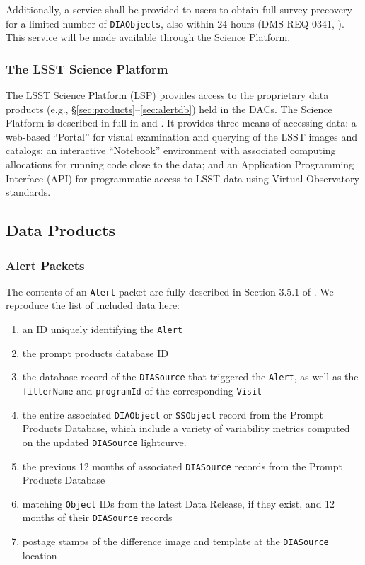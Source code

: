 Additionally, a service shall be provided to users to obtain full-survey precovery for a limited number of {\tt DIAObjects}, also within 24 hours (DMS-REQ-0341, ).
This service will be made available through the Science Platform.

\subsubsection{The LSST Science Platform} \label{sec:LSP}

The LSST Science Platform (LSP) provides access to the proprietary data products (e.g., \S \ref{sec:products}--\ref{sec:alertdb}) held in the DACs.
The Science Platform is described in full in  and .
It provides three means of accessing data: a web-based ``Portal'' for visual examination and querying of the LSST images and catalogs; 
an interactive ``Notebook'' environment with associated computing allocations for running code close to the data; 
and an Application Programming Interface (API) for programmatic access to LSST data using Virtual Observatory standards.

\subsection{Data Products}
\subsubsection{Alert Packets}\label{sec:packets}

The contents of an {\tt Alert} packet are fully described in Section 3.5.1 of . We reproduce the list of included data here:
\renewcommand{\labelenumi}{\Roman{enumi}.}
\begin{enumerate}
\item an ID uniquely identifying the {\tt Alert}
\item the prompt products database ID
\item the database record of the {\tt DIASource} that triggered the {\tt Alert}, as well as the \texttt{filterName} and \texttt{programId} of the corresponding \texttt{Visit}
\item the entire associated {\tt DIAObject} or {\tt SSObject} record from the Prompt Products Database, which include a variety of variability metrics computed on the 
updated \texttt{DIASource} lightcurve.
\item the previous 12 months of associated {\tt DIASource} records from the Prompt Products Database
\item matching {\tt Object} IDs from the latest Data Release, if they exist, and 12 months of their {\tt DIASource} records
\item postage stamps of the difference image and template at the {\tt DIASource} location
\end{enumerate}

